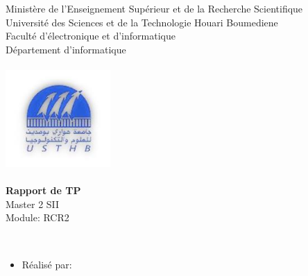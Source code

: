 \documentclass[12pt , a4paper]{report}
\begin{document}
\begin{center}
\normalsize{Ministère de l'Enseignement Supérieur et de la Recherche Scientifique}\\
\normalsize{Université des Sciences et de la Technologie Houari Boumediene}\\
\normalsize{Faculté d'électronique et d'informatique}\\
\normalsize{Département d'informatique}\\
\end{center}
\begin{center}
\includegraphics[width=4cm,height=4cm]{usthb.jpg}
\end{center}


\begin{center}
\Huge{\textbf{Rapport de TP}}\\
\vspace{0.7cm}
\large{Master 2 SII}\\
\vspace{0.2cm}
\large{Module: RCR2}\\
\vspace{1.5cm}
\normalsize{\textbf{}}
\end{center}
\vspace{3cm}
\\
\begin{itemize}
    \item{Réalisé par:}
\end{itemize}
\vspace{4cm}
\end{document}
